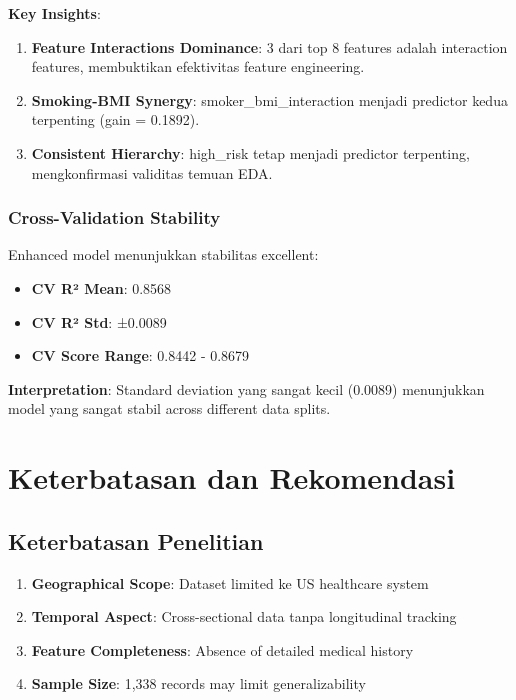 \textbf{Key Insights}:
\begin{enumerate}
    \item \textbf{Feature Interactions Dominance}: 3 dari top 8 features adalah interaction features, membuktikan efektivitas feature engineering.
    \item \textbf{Smoking-BMI Synergy}: smoker\_bmi\_interaction menjadi predictor kedua terpenting (gain = 0.1892).
    \item \textbf{Consistent Hierarchy}: high\_risk tetap menjadi predictor terpenting, mengkonfirmasi validitas temuan EDA.
\end{enumerate}

\subsubsection{Cross-Validation Stability}
Enhanced model menunjukkan stabilitas excellent:
\begin{itemize}
    \item \textbf{CV R² Mean}: 0.8568
    \item \textbf{CV R² Std}: ±0.0089
    \item \textbf{CV Score Range}: 0.8442 - 0.8679
\end{itemize}

\textbf{Interpretation}: Standard deviation yang sangat kecil (0.0089) menunjukkan model yang sangat stabil across different data splits.

\section{Keterbatasan dan Rekomendasi}
\label{sec:keterbatasan}

\subsection{Keterbatasan Penelitian}
\label{subsec:keterbatasan}

\begin{enumerate}
    \item \textbf{Geographical Scope}: Dataset limited ke US healthcare system
    \item \textbf{Temporal Aspect}: Cross-sectional data tanpa longitudinal tracking
    \item \textbf{Feature Completeness}: Absence of detailed medical history
    \item \textbf{Sample Size}: 1,338 records may limit generalizability
\end{enumerate}

